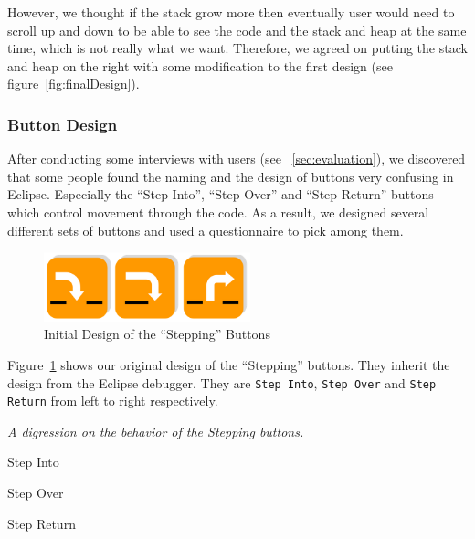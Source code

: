 \documentclass[11pt, a4paper]{article}
\newcommand{\cmd}[1]{{\tt #1}}
\begin{document}
However, we thought if the stack grow more then eventually user would need to scroll up and down to be able to see the code and the stack and heap at the same time, which is not really what we want.
Therefore, we agreed on putting the stack and heap on the right with some modification to the first design (see figure~\ref{fig:finalDesign}).

\subsubsection{Button Design}
After conducting some interviews with users (see ~\cref{sec:evaluation}), we discovered that some people found the naming and the design of buttons very confusing in Eclipse.
Especially the ``Step Into'', ``Step Over'' and ``Step Return'' buttons which control movement through the code.
As a result, we designed several different sets of buttons and used a questionnaire to pick among them.

\begin{figure}[h!]
\centering
\includegraphics[height=20mm,width=60mm]{buttons1.png}
\caption{Initial Design of the ``Stepping'' Buttons}
\label{fig:button1}
\end{figure}

Figure~\ref{fig:button1} shows our original design of the ``Stepping'' buttons.
They inherit the design from the Eclipse debugger.
They are \cmd{Step Into}, \cmd{Step Over} and \cmd{Step Return} from left to right respectively.

\begin{framed}
\emph{A digression on the behavior of the Stepping buttons.}

\begin{description}
\item Step Into
\item Step Over
\item Step Return
\end{description}

\end{framed}
\end{document}
